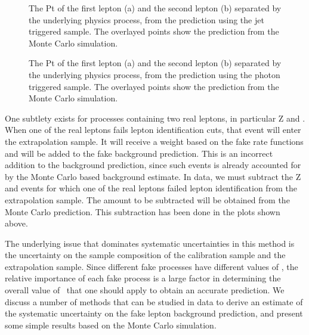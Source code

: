 \documentclass{cmspaper}
\begin{document}
\begin{figure}[htb]
  \begin{center}
    \caption{The Pt of the first lepton (a) and the second lepton (b) separated by the underlying physics process, from the prediction using the jet triggered sample. The overlayed points show the prediction from the Monte Carlo simulation. }
    \label{fig:leptonPtStacked_JetTriggerSample}
  \end{center}
\end{figure}

\begin{figure}[htb]
  \begin{center}
    \caption{The Pt of the first lepton (a) and the second lepton (b) separated by the underlying physics process, from the prediction using the photon triggered sample. The overlayed points show the prediction from the Monte Carlo simulation.}
    \label{fig:leptonPtStacked_PhotonTriggerSample}
  \end{center}
\end{figure}

One subtlety exists for processes containing two real leptons, in particular Z and \TTBAR. When one of the real leptons fails lepton identification cuts, that event will enter the extrapolation sample. It will receive a weight based on the fake rate functions and will be added to the fake background prediction. This is an incorrect addition to the background prediction, since such events is already accounted for by the Monte Carlo based background estimate. In data, we must subtract the Z and \TTBAR events for which one of the real leptons failed lepton identification from the extrapolation sample. The amount to be subtracted will be obtained from the Monte Carlo prediction. This subtraction has been done in the plots shown above.


The underlying issue that dominates systematic uncertainties in this method is the uncertainty on the sample composition of the calibration sample and the extrapolation sample. Since different fake processes have different values of \epsilonFake, the relative importance of each fake process is a large factor in determining the overall value of \epsilonFake~that one should apply to obtain an accurate prediction. We discuss a number of methods that can be studied in data to derive an estimate of the systematic uncertainty on the fake lepton background prediction, and present some simple results based on the Monte Carlo simulation.
\end{document}
